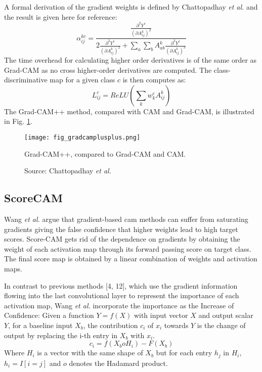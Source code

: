 A formal derivation of the gradient weights is defined by Chattopadhay \textit{et al.} \cite{chattopadhay2018grad} and the result is given here for reference:
\begin{equation}
    \alpha_{ij}^{kc} = \frac{\frac{\partial^{2}{Y^c}}{\left( \partial{A_{ij}^{k}} \right)^2}}{2\frac{\partial^{2}{Y^c}}{\left( \partial{A_{ij}^{k}} \right)^2} + \sum_a \sum_b A_{ab}^{k} {\frac{\partial^{3}{Y^c}}{\left( \partial{A_{ij}^{k}} \right)^3}} }
\end{equation}
The time overhead for calculating higher order derivatives is of the same order as Grad-CAM as no cross higher-order derivatives are computed. The class-discriminative map for a given class $c$ is then computes as:
\begin{equation}
    L_{ij}^{c} = ReLU \left( \sum_{k}w_{k}^{c} A_{ij}^{k} \right)
\end{equation}
The Grad-CAM++ method, compared with CAM and Grad-CAM, is illustrated in Fig. \ref{fig:gradcamplusplus}.
\begin{figure}[ht]
    \begin{center}       
    \texttt{[image: fig\_gradcamplusplus.png]}
    \caption[Grad-CAM++]{Grad-CAM++, compared to Grad-CAM and CAM.}
    \caption*{Source: Chattopadhay \textit{et al.} \cite{chattopadhay2018grad}}
    \label{fig:gradcamplusplus}
    \end{center}
\end{figure}

\subsection{ScoreCAM}
Wang \textit{et al.} argue that gradient-based \acrshort{cam} methods can suffer from saturating gradients giving the false confidence that higher weights lead to high target scores. Score-CAM gets rid of the dependence on gradients by obtaining the weight of each activation map through its forward passing score on target class. The final score map is obtained by a linear combination of weights and activation maps.

In contrast to previous methods [4, 12], which use the gradient information flowing into the last convolutional layer to represent the importance of each activation map, Wang \textit{et al.} incorporate the importance as the Increase of Confidence: Given a function $Y = f(X)$ with input vector $X$ and output scalar $Y$, for a baseline input $X_b$, the contribution $c_i$ of $x_i$ towards $Y$ is the change of output by replacing the i-th entry in $X_b$ with $x_i$.
\begin{equation}
    c_i = f(X_b o H_i) - F(X_b)
\end{equation}
Where $H_i$ is a vector with the same shape of $X_b$ but for each entry $h_j$ in $H_i$, $h_i = I[i=j]$ and $o$ denotes the Hadamard product.


